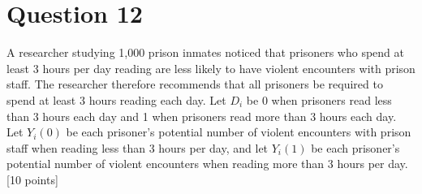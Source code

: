 \documentclass[11pt,notitlepage]{article}		%
\begin{document}
\section*{Question 12}
A researcher studying 1,000 prison inmates noticed that prisoners who spend at least 3 hours per day reading are less likely to have violent encounters with prison staff.  The researcher therefore recommends that all prisoners be required to spend at least 3 hours reading each day.  Let $D_i$ be 0 when prisoners read less than 3 hours each day and 1 when prisoners read more than 3 hours each day. Let $Y_i (0)$ be each prisoner's potential number of violent encounters with prison staff when reading less than 3 hours per day, and let $Y_i (1)$ be each prisoner's potential number of violent encounters when reading more than 3 hours per day. [10 points]
\end{document}
